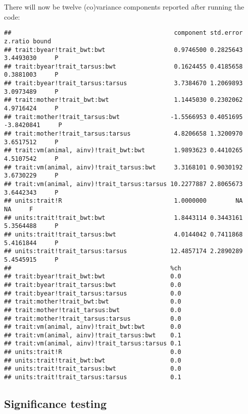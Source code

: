 \documentclass[
  12pt,
]{book}
\newenvironment{Shaded}{\begin{snugshade}}{\end{snugshade}}
\newcommand{\FunctionTok}[1]{\textcolor[rgb]{0.00,0.00,0.00}{#1}}
\newcommand{\NormalTok}[1]{#1}
\newcommand{\SpecialCharTok}[1]{\textcolor[rgb]{0.00,0.00,0.00}{#1}}
\begin{document}
There will now be twelve (co)variance components reported after running the code:

\begin{Shaded}
\end{Shaded}

\begin{verbatim}
##                                             component std.error    z.ratio bound
## trait:byear!trait_bwt:bwt                   0.9746500 0.2825643  3.4493030     P
## trait:byear!trait_tarsus:bwt                0.1624455 0.4185658  0.3881003     P
## trait:byear!trait_tarsus:tarsus             3.7384670 1.2069893  3.0973489     P
## trait:mother!trait_bwt:bwt                  1.1445030 0.2302062  4.9716424     P
## trait:mother!trait_tarsus:bwt              -1.5566953 0.4051695 -3.8420841     P
## trait:mother!trait_tarsus:tarsus            4.8206658 1.3200970  3.6517512     P
## trait:vm(animal, ainv)!trait_bwt:bwt        1.9893623 0.4410265  4.5107542     P
## trait:vm(animal, ainv)!trait_tarsus:bwt     3.3168101 0.9030192  3.6730229     P
## trait:vm(animal, ainv)!trait_tarsus:tarsus 10.2277887 2.8065673  3.6442343     P
## units:trait!R                               1.0000000        NA         NA     F
## units:trait!trait_bwt:bwt                   1.8443114 0.3443161  5.3564488     P
## units:trait!trait_tarsus:bwt                4.0144042 0.7411868  5.4161844     P
## units:trait!trait_tarsus:tarsus            12.4857174 2.2890289  5.4545915     P
##                                            %ch
## trait:byear!trait_bwt:bwt                  0.0
## trait:byear!trait_tarsus:bwt               0.0
## trait:byear!trait_tarsus:tarsus            0.0
## trait:mother!trait_bwt:bwt                 0.0
## trait:mother!trait_tarsus:bwt              0.0
## trait:mother!trait_tarsus:tarsus           0.0
## trait:vm(animal, ainv)!trait_bwt:bwt       0.0
## trait:vm(animal, ainv)!trait_tarsus:bwt    0.1
## trait:vm(animal, ainv)!trait_tarsus:tarsus 0.1
## units:trait!R                              0.0
## units:trait!trait_bwt:bwt                  0.0
## units:trait!trait_tarsus:bwt               0.0
## units:trait!trait_tarsus:tarsus            0.1
\end{verbatim}

\hypertarget{significance-testing}{%
\subsection{Significance testing}\label{significance-testing}}
\end{document}
